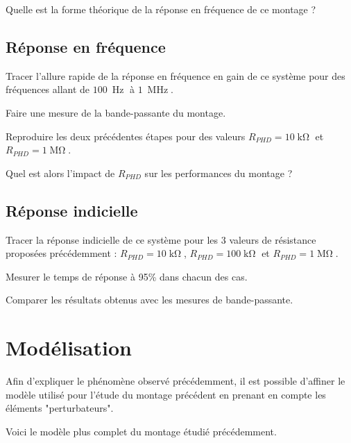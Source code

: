 \Quest Quelle est la forme théorique de la réponse en fréquence de ce montage ?




\subsection{Réponse en fréquence}

\Manip Tracer l'allure rapide de la réponse en fréquence en gain de ce système pour des fréquences allant de $100~\operatorname{Hz}$ à $1~\operatorname{MHz}$.

\Manip Faire une mesure de la bande-passante du montage.

\Manip Reproduire les deux précédentes étapes pour des valeurs $R_{PHD} = 10\operatorname{k\Omega}$ et $R_{PHD} = 1\operatorname{M\Omega}$. 

\Quest Quel est alors l'impact de $R_{PHD}$ sur les performances du montage ?

\subsection{Réponse indicielle}

\Manip Tracer la réponse indicielle de ce système pour les 3 valeurs de résistance proposées précédemment : $R_{PHD} = 10\operatorname{k\Omega}$, $R_{PHD} = 100\operatorname{k\Omega}$ et $R_{PHD} = 1\operatorname{M\Omega}$.

\Manip Mesurer le temps de réponse à 95\% dans chacun des cas.

\Quest Comparer les résultats obtenus avec les mesures de bande-passante.

\section{Modélisation}

Afin d'expliquer le phénomène observé précédemment, il est possible d'affiner le modèle utilisé pour l'étude du montage précédent en prenant en compte les éléments "perturbateurs".

Voici le modèle plus complet du montage étudié précédemment.

